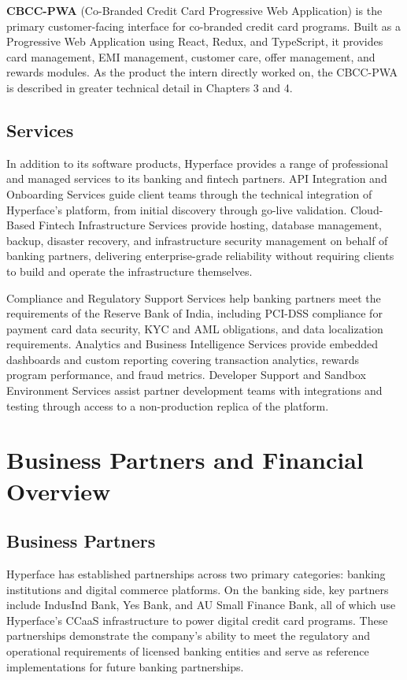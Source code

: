 \textbf{CBCC-PWA} (Co-Branded Credit Card Progressive Web Application) is the primary customer-facing interface for co-branded credit card programs. Built as a Progressive Web Application using React, Redux, and TypeScript, it provides card management, EMI management, customer care, offer management, and rewards modules. As the product the intern directly worked on, the CBCC-PWA is described in greater technical detail in Chapters 3 and 4.

\subsection{Services}

In addition to its software products, Hyperface provides a range of professional and managed services to its banking and fintech partners. API Integration and Onboarding Services guide client teams through the technical integration of Hyperface's platform, from initial discovery through go-live validation. Cloud-Based Fintech Infrastructure Services provide hosting, database management, backup, disaster recovery, and infrastructure security management on behalf of banking partners, delivering enterprise-grade reliability without requiring clients to build and operate the infrastructure themselves.

Compliance and Regulatory Support Services help banking partners meet the requirements of the Reserve Bank of India, including PCI-DSS compliance for payment card data security, KYC and AML obligations, and data localization requirements. Analytics and Business Intelligence Services provide embedded dashboards and custom reporting covering transaction analytics, rewards program performance, and fraud metrics. Developer Support and Sandbox Environment Services assist partner development teams with integrations and testing through access to a non-production replica of the platform.

\section{Business Partners and Financial Overview}

\subsection{Business Partners}

Hyperface has established partnerships across two primary categories: banking institutions and digital commerce platforms. On the banking side, key partners include IndusInd Bank, Yes Bank, and AU Small Finance Bank, all of which use Hyperface's CCaaS infrastructure to power digital credit card programs. These partnerships demonstrate the company's ability to meet the regulatory and operational requirements of licensed banking entities and serve as reference implementations for future banking partnerships.

